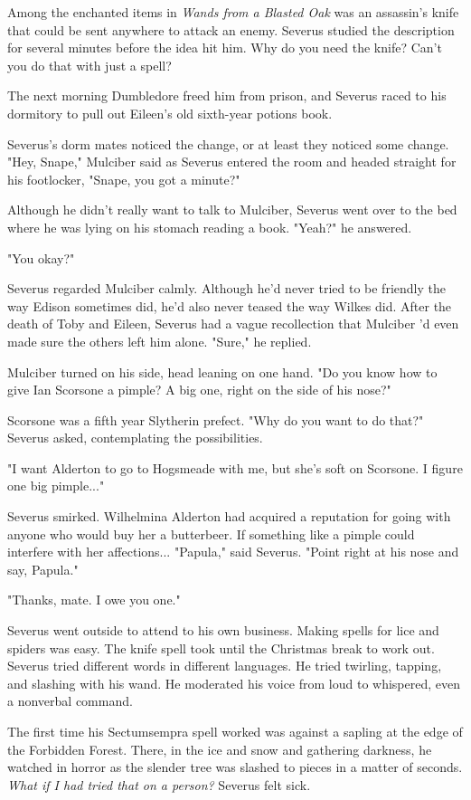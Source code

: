 \documentclass[a4paper,11pt]{article}
\begin{document}
Among the enchanted items in \emph{Wands from a Blasted Oak} was an assassin's knife that could be sent anywhere to attack an enemy. Severus studied the description for several minutes before the idea hit him. Why do you need the knife? Can't you do that with just a spell?

The next morning Dumbledore freed him from prison, and Severus raced to his dormitory to pull out Eileen's old sixth-year potions book.

Severus's dorm mates noticed the change, or at least they noticed some change. "Hey, Snape," Mulciber said as Severus entered the room and headed straight for his footlocker, "Snape, you got a minute?"

Although he didn't really want to talk to Mulciber, Severus went over to the bed where he was lying on his stomach reading a book. "Yeah?" he answered.

"You okay?"

Severus regarded Mulciber calmly. Although he'd never tried to be friendly the way Edison sometimes did, he'd also never teased the way Wilkes did. After the death of Toby and Eileen, Severus had a vague recollection that Mulciber 'd even made sure the others left him alone. "Sure," he replied.

Mulciber turned on his side, head leaning on one hand. "Do you know how to give Ian Scorsone a pimple? A big one, right on the side of his nose?"

Scorsone was a fifth year Slytherin prefect. "Why do you want to do that?" Severus asked, contemplating the possibilities.

"I want Alderton to go to Hogsmeade with me, but she's soft on Scorsone. I figure one big pimple..."

Severus smirked. Wilhelmina Alderton had acquired a reputation for going with anyone who would buy her a butterbeer. If something like a pimple could interfere with her affections... "Papula," said Severus. "Point right at his nose and say, Papula."

"Thanks, mate. I owe you one."

Severus went outside to attend to his own business. Making spells for lice and spiders was easy. The knife spell took until the Christmas break to work out. Severus tried different words in different languages. He tried twirling, tapping, and slashing with his wand. He moderated his voice from loud to whispered, even a nonverbal command.

The first time his Sectumsempra spell worked was against a sapling at the edge of the Forbidden Forest. There, in the ice and snow and gathering darkness, he watched in horror as the slender tree was slashed to pieces in a matter of seconds. \emph{What if I had tried that on a person?} Severus felt sick.
\end{document}
